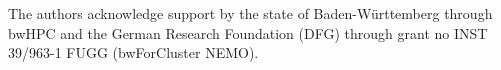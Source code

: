 The authors acknowledge support by the state of Baden-Württemberg through bwHPC
and the German Research Foundation (DFG) through grant no INST 39/963-1 FUGG (bwForCluster NEMO).